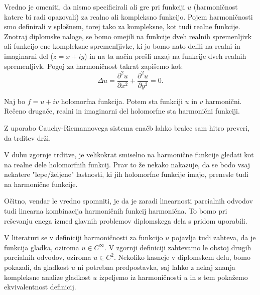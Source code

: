 \documentclass[mat1]{fmfdelo}
\begin{document}
    \begin{opomba}
        Vredno je omeniti, da nismo specificirali ali gre pri funkciji $u$ (harmoničnost katere bi radi opazovali) za realno ali kompleksno funkcijo. 
        Pojem harmoničnosti smo definirali v splošnem, torej tako za kompleksne, kot tudi realne funkcije.
        Znotraj diplomske naloge, se bomo omejili na funkcije dveh realnih spremenljivk ali funkcijo ene kompleksne spremenljivke, ki jo bomo nato delili na realni in imaginarni del ($z = x + iy $) in na ta način prešli nazaj na funkcije dveh realnih spremenljivk.
        \newline
        Pogoj za harmoničnost takrat zapišemo kot: 
            $$
                \Delta u = \frac{\partial^2 u}{\partial x ^ 2} +  \frac{\partial^2 u}{\partial y ^ 2}= 0.
            $$
    \end{opomba}
    \begin{trditev}
        \label{hh}
        Naj bo $f = u + iv$ holomorfna funkcija. Potem sta funkciji $u$ in $v$ harmonični. Rečeno drugače, realni in imaginarni del holomorfne sta harmonični funkciji. 
    \end{trditev}
    \begin{dokaz}
        Z uporabo Cauchy-Riemannovega sistema enačb lahko bralec sam hitro preveri, da trditev drži.
    \end{dokaz}

    \begin{opomba}
        V duhu zgornje trditve, je velikokrat smiselno na harmonične funkcije gledati kot na realne dele holomorfnih funkcij. Prav to že nekako nakazuje, da se bodo vsaj nekatere "lepe/željene" lastnosti, ki jih holomorfne funkcije imajo, prenesle tudi na harmonične funkcije.
    \end{opomba}
    \begin{opomba}
        \label{lin}
        Očitno, vendar le vredno spomniti, je da je zaradi linearnosti parcialnih odvodov tudi linearna kombinacija harmoničnih funkcij harmonična. To bomo pri reševanju enega izmed glavnih problemov diplomskega dela s pridom uporabili.
    \end{opomba}
    \begin{opomba}
        V literaturi se v definiciji harmoničnosti za funkcijo $u$ pojavlja tudi zahteva, da je funkcija gladka, oziroma $u \in C^{\infty}$. V zgornji definiciji zahtevamo le obstoj drugih parcialnih odvodov, oziroma $u \in C^2$. 
        Nekoliko kasneje v diplomskem delu, bomo pokazali, da gladkost $u$ ni potrebna predpostavka, saj lahko z nekaj znanja kompleksne analize gladkost $u$ izpeljemo iz harmoničnosti $u$ in s tem pokažemo ekvivalentnost definicij. 
    \end{opomba}
\end{document}

